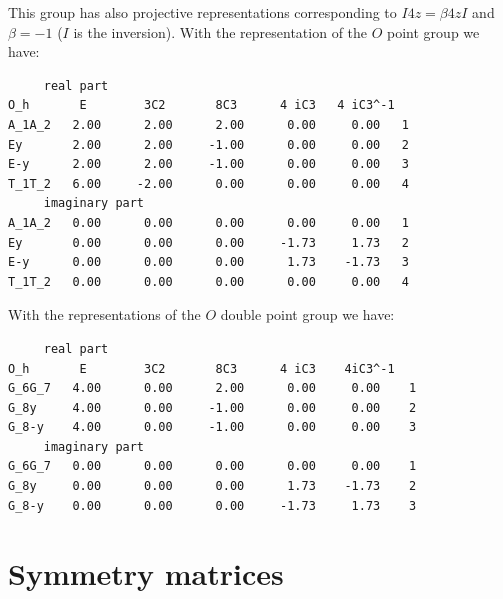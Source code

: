 \documentclass[12pt,a4paper]{article}
\begin{document}
This group has also projective representations corresponding to
$I {4z} = \beta {4z} I$ and $\beta=-1$ ($I$ is the inversion). With
the representation of the $O$ point group we have:
\begin{verbatim}
     real part
O_h       E        3C2       8C3      4 iC3   4 iC3^-1  
A_1A_2   2.00      2.00      2.00      0.00     0.00   1
Ey       2.00      2.00     -1.00      0.00     0.00   2
E-y      2.00      2.00     -1.00      0.00     0.00   3
T_1T_2   6.00     -2.00      0.00      0.00     0.00   4
     imaginary part
A_1A_2   0.00      0.00      0.00      0.00     0.00   1
Ey       0.00      0.00      0.00     -1.73     1.73   2
E-y      0.00      0.00      0.00      1.73    -1.73   3 
T_1T_2   0.00      0.00      0.00      0.00     0.00   4
\end{verbatim}
With the representations of the $O$ double point group we have:
\begin{verbatim}
     real part
O_h       E        3C2       8C3      4 iC3    4iC3^-1 
G_6G_7   4.00      0.00      2.00      0.00     0.00    1
G_8y     4.00      0.00     -1.00      0.00     0.00    2
G_8-y    4.00      0.00     -1.00      0.00     0.00    3
     imaginary part
G_6G_7   0.00      0.00      0.00      0.00     0.00    1
G_8y     0.00      0.00      0.00      1.73    -1.73    2
G_8-y    0.00      0.00      0.00     -1.73     1.73    3
\end{verbatim}


\newpage
\section{\color{coral}Symmetry matrices
\label{section_sym}}
\end{document}
